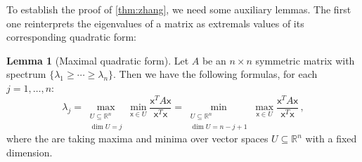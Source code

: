\documentclass[12pt]{amsart}
\theoremstyle{definition}
\newtheorem{lm}[thm]{Lemma}
\newcommand{\R}{\mathbb{R}}
\newcommand{\vx}{\mathsf{x}}
\begin{document}
To establish the proof of \cref{thm:zhang}, we need some auxiliary lemmas.
The first one reinterprets the eigenvalues of a matrix as extremals values of its corresponding quadratic form:

\begin{lm}[Maximal quadratic form]\label{lm:maximalquad_EV}
Let $A$ be an $n \times n$ symmetric matrix with spectrum $\{\lambda_1 \geq \cdots \geq \lambda_n\}$.
Then we have the following formulas, for each $j = 1, \ldots , n$:
$$\lambda_j = \max_{\substack{U \subseteq \R^n \\ \dim U = j}} \min_{\vx \in U} \frac{\vx^T A \vx}{\vx^T\vx} = \min_{\substack{U \subseteq \R^n \\ \dim U = n-j+1}} \max_{\vx \in U} \frac{\vx^T A \vx}{\vx^T\vx} \, ,$$
where the are taking maxima and minima over vector spaces $U \subseteq \R^n$ with a fixed dimension.
\end{lm}
\end{document}
